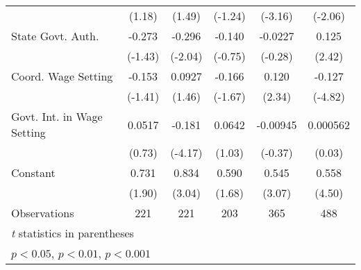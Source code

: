\begin{table}[htbp]
\begin{tabular}{l*{5}{c}}
                                        &   (1.18)         &   (1.49)         &  (-1.24)         &  (-3.16)         &  (-2.06)         \\
\addlinespace
State Govt. Auth.                       &   -0.273         &   -0.296\sym{*}  &   -0.140         &  -0.0227         &    0.125\sym{*}  \\
                                        &  (-1.43)         &  (-2.04)         &  (-0.75)         &  (-0.28)         &   (2.42)         \\
\addlinespace
Coord. Wage Setting                     &   -0.153         &   0.0927         &   -0.166         &    0.120\sym{*}  &   -0.127\sym{***}\\
                                        &  (-1.41)         &   (1.46)         &  (-1.67)         &   (2.34)         &  (-4.82)         \\
\addlinespace
Govt. Int. in Wage Setting              &   0.0517         &   -0.181\sym{***}&   0.0642         & -0.00945         & 0.000562         \\
                                        &   (0.73)         &  (-4.17)         &   (1.03)         &  (-0.37)         &   (0.03)         \\
\addlinespace
Constant                                &    0.731         &    0.834\sym{**} &    0.590         &    0.545\sym{**} &    0.558\sym{***}\\
                                        &   (1.90)         &   (3.04)         &   (1.68)         &   (3.07)         &   (4.50)         \\
\midrule
Observations                            &      221         &      221         &      203         &      365         &      488         \\
\bottomrule
\multicolumn{6}{l}{\footnotesize \textit{t} statistics in parentheses}\\
\multicolumn{6}{l}{\footnotesize \sym{*} \(p<0.05\), \sym{**} \(p<0.01\), \sym{***} \(p<0.001\)}\\
\end{tabular}
\end{table}
